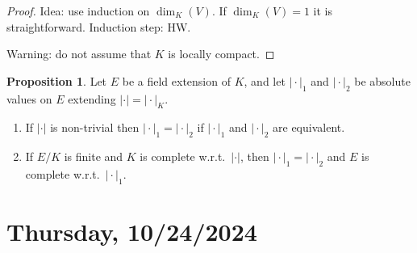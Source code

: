 \documentclass[openany]{amsbook}
\numberwithin{section}{chapter}
\theoremstyle{definition}
\newtheorem{proposition}[theorem]{Proposition}
\begin{document}
\begin{proof}
    Idea: use induction on \(\dim_K(V)\). If \(\dim_K(V)=1\) it is straightforward. Induction step: HW.

    Warning: do not assume that \(K\) is locally compact.
\end{proof}

\begin{proposition}
    Let \(E\) be a field extension of \(K\), and let \(\vert \cdot \vert_1\) and \(\vert \cdot \vert_2\) be absolute values on \(E\) extending \(\vert \cdot \vert = \vert \cdot \vert _K\).

    \begin{enumerate}[label=\roman*)]
        \item If \(\vert \cdot \vert \) is non-trivial then \(\vert \cdot \vert _1 = \vert \cdot \vert _2\) if \(\vert \cdot \vert _1\) and \(\vert \cdot \vert _2\) are equivalent.
        
        \item If \(E / K\) is finite and \(K\) is complete w.r.t.\ \(\vert \cdot \vert \), then \(\vert \cdot \vert _1 = \vert \cdot \vert _2\) and \(E\) is complete w.r.t.\ \(\vert \cdot \vert _1\).
    \end{enumerate} 
\end{proposition}

\section*{Thursday, 10/24/2024}
\end{document}
